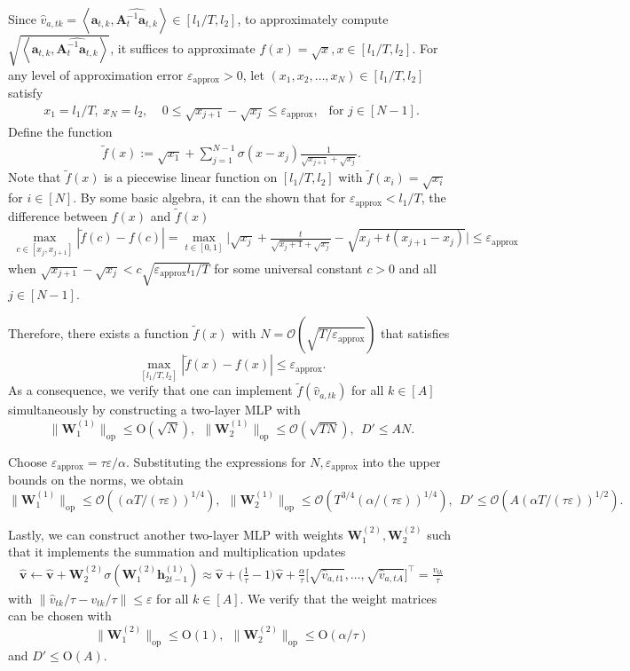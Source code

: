 \documentclass[10pt]{article}
\renewcommand{\hat}{\widehat}
\newcommand{\eps}{\varepsilon}
\newcommand{\lops}[1]{\|{#1}\|_{\mathrm{op}}}
\renewcommand{\cO}{\mathcal{O}}
\newcommand{\<}{\left\langle}
\renewcommand{\>}{\right\rangle}
\newcommand{\lran}{{l_1}}
\newcommand{\uran}{{l_2}}
\newcommand{\appr}{{\mathrm{approx}}}
\newcommand{\temp}{{\tau}}
\newcommand{\hidden}{{D'}}
\newcommand{\conO}{{\mathrm{O}}}
\def\bA{{\mathbf A}}
\def\bW{{\mathbf W}}
\def\ba{{\mathbf a}}
\def\bh{{\mathbf h}}
\def\bv{{\mathbf v}}
\begin{document}
Since $\hat v_{a,tk}=\<\ba_{t,k},\widehat{\bA_t^{-1}\ba_{t,k}}\>\in[\lran/T,\uran]$, to approximately compute $\sqrt{\<\ba_{t,k},\widehat{\bA_t^{-1}\ba_{t,k}}\>}$, it suffices to approximate $f(x)=\sqrt{x},x\in[\lran/T,\uran]$. For any  level of approximation error $\eps_\appr>0$, let $(x_1,x_2,\ldots,x_N)\in[\lran/T,\uran]$ satisfy
\begin{align*}
x_1=\lran/T,~x_N=\uran,   ~~~~~
    0\leq\sqrt{x_{j+1}}-\sqrt{x_{j}}\leq\eps_\appr,~~\text{ for }j\in[N-1].
\end{align*}
Define the function
\begin{align*}
    \tilde f(x):=\sqrt{x_1}+\sum_{j=1}^{N-1}\sigma(x-x_{j})\frac{1}{\sqrt{x_{j+1}}+\sqrt{x_j}}.
\end{align*} Note that $\tilde f(x)$ is a piecewise linear function on $[\lran/T,\uran]$ with $\tilde f(x_i)=\sqrt{x_i}$ for $i\in[N]$. By some basic algebra,  it can the shown that for $\eps_\appr<\lran/T$, the difference between $f(x)$ and $\tilde f(x)$
\begin{align*}
   \max_{c\in[x_j,x_{j+1}]} |\tilde f(c)-f(c)|=\max_{t\in[0,1]}\Big|\sqrt{x_j}+\frac{t}{\sqrt{x_j+1}+\sqrt{x_j}}-\sqrt{x_j+t(x_{j+1}-x_j)}\Big|\leq\eps_\appr
\end{align*} when $\sqrt{x_{j+1}}-\sqrt{x_{j}}<c\sqrt{\eps_\appr\lran/T}$ for some universal constant $c>0$ and all $j\in[N-1]$. 

Therefore, 
 there exists a function $\tilde f(x)$ with $N=\cO(\sqrt{T/\eps_\appr})$ that satisfies $$\max_{[\lran/T,\uran]}|\tilde f(x)-f(x)|\leq\eps_\appr.$$ 
 As a consequence, we verify that one can implement $\tilde f(\hat v_{a,tk})$ for all $k\in[A]$ simultaneously  by constructing a two-layer MLP with $$\lops{\bW_1^{(1)}}\leq \conO(\sqrt{N}),~~\lops{\bW_2^{(1)}}\leq \cO(\sqrt{TN}),~~\hidden\leq AN.$$






 
 
 Choose $\eps_{\appr}=\temp\eps/\alpha$. Substituting the expressions for $N,\eps_\appr$ into the upper bounds on the norms, we obtain
 $$\lops{\bW_1^{(1)}}\leq \cO(({\alpha T/(\temp\eps)})^{1/4}),~~\lops{\bW_2^{(1)}}\leq \cO(T^{3/4}({\alpha/(\temp\eps)})^{1/4}),~~\hidden\leq \cO(A({\alpha T/(\temp\eps)})^{1/2}).$$

 
 Lastly, we can construct another two-layer MLP with weights $\bW^{(2)}_1,\bW^{(2)}_2$ such that it implements the summation and multiplication updates 
 \begin{align*}
 \hat\bv\leftarrow\hat\bv+\bW^{(2)}_2\sigma(\bW^{(2)}_1\bh_{2t-1}^{(1)})\approx\hat\bv+\Big(\frac1\temp-1\Big)\hat\bv+\frac\alpha\temp\Big[\sqrt{ \hat v_{a,t1}},\ldots,\sqrt{ \hat v_{a,tA}}\Big]^\top=\frac{\hat v_{tk}}{\temp}
 \end{align*}
with $\|\hat v_{tk}/\temp-v_{tk}/\temp\|\leq \eps$ for all $k\in[A]$. We verify that the weight matrices can be chosen with
  $$
 \lops{\bW^{(2)}_1}\leq \conO(1),~~ \lops{\bW^{(2)}_2}\leq \conO(\alpha/\temp)
 $$ and $\hidden\leq \conO(A)$.
\end{document}
